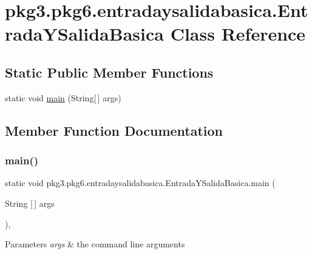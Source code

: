 \hypertarget{classpkg3_1_1pkg6_1_1entradaysalidabasica_1_1_entrada_y_salida_basica}{}\section{pkg3.\+pkg6.\+entradaysalidabasica.\+Entrada\+Y\+Salida\+Basica Class Reference}
\label{classpkg3_1_1pkg6_1_1entradaysalidabasica_1_1_entrada_y_salida_basica}
\subsection*{Static Public Member Functions}
\begin{DoxyCompactItemize}
\item 
static void \mbox{\hyperlink{classpkg3_1_1pkg6_1_1entradaysalidabasica_1_1_entrada_y_salida_basica_a83313a6dcc83eb59319aad6eeb10b853}{main}} (String\mbox{[}$\,$\mbox{]} args)
\end{DoxyCompactItemize}


\subsection{Member Function Documentation}
\mbox{\label{classpkg3_1_1pkg6_1_1entradaysalidabasica_1_1_entrada_y_salida_basica_a83313a6dcc83eb59319aad6eeb10b853}} 
\subsubsection{\texorpdfstring{main()}{main()}}
{\footnotesize\ttfamily static void pkg3.\+pkg6.\+entradaysalidabasica.\+Entrada\+Y\+Salida\+Basica.\+main (\begin{DoxyParamCaption}\item[{String \mbox{[}$\,$\mbox{]}}]{args }\end{DoxyParamCaption})\hspace{0.3cm}{\ttfamily [inline]}, {\ttfamily [static]}}


\begin{DoxyParams}{Parameters}
{\em args} & the command line arguments \\
\hline
\end{DoxyParams}

